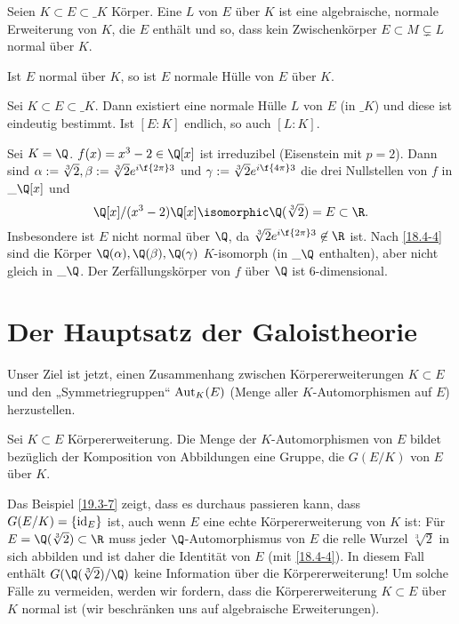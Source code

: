 \begin{df} \label{19.3-5}
	Seien $K \subset E \subset \_K$ Körper.
	Eine  $L$ von $E$ über $K$ ist eine algebraische, normale Erweiterung von $K$, die $E$ enthält und so, dass kein Zwischenkörper $E \subset M \subsetneq L$ normal über $K$.
\end{df}

\begin{note}
	Ist $E$ normal über $K$, so ist $E$ normale Hülle von $E$ über $K$.
\end{note}

\begin{st} \label{19.3-6}
	Sei $K \subset E \subset \_K$.
	Dann existiert eine normale Hülle $L$ von $E$ (in $\_K$) und diese ist eindeutig bestimmt.
	Ist $[E : K]$ endlich, so auch $[L : K]$.
\end{st}

\begin{ex} \label{19.3-7}
	Sei $K = \Q$.
	$f(x) = x^3 - 2 \in \Q[x]$ ist irreduzibel (Eisenstein mit $p = 2$).
	Dann sind $\alpha := \sqrt[3]{2}, \beta := \sqrt[3]{2} e^{i\f{2\pi}3}$ und $\gamma := \sqrt[3]{2} e^{i\f{4\pi}3}$ die drei Nullstellen von $f$ in $\_{\Q}[x]$ und
	\[
		\Q[x] / (x^3-2)\Q[x] \isomorphic \Q(\sqrt[3]{2}) = E \subset \R.
	\]
	Insbesondere ist $E$ nicht normal über $\Q$, da $\sqrt[3]{2} e^{i\f{2\pi}3} \not\in \R$ ist.
	Nach \ref{18.4-4} sind die Körper $\Q(\alpha), \Q(\beta), \Q(\gamma)$ $K$-isomorph (in $\_\Q$ enthalten), aber nicht gleich in $\_{\Q}$.
	Der Zerfällungskörper von $f$ über $\Q$ ist 6-dimensional.
\end{ex}


\section{Der Hauptsatz der Galoistheorie}


Unser Ziel ist jetzt, einen Zusammenhang zwischen Körpererweiterungen $K \subset E$ und den „Symmetriegruppen“ $\operatorname{Aut}_K(E)$ (Menge aller $K$-Automorphismen auf $E$) herzustellen.

\begin{df} \label{19.4-1}
	Sei $K \subset E$ Körpererweiterung.
	Die Menge der $K$-Automorphismen von $E$ bildet bezüglich der Komposition von Abbildungen eine Gruppe, die  $G(E/K)$ von $E$ über $K$.
\end{df}

Das Beispiel \ref{19.3-7} zeigt, dass es durchaus passieren kann, dass $G(E/K) = \{ \operatorname{id}_E \}$ ist, auch wenn $E$ eine echte Körpererweiterung von $K$ ist:
Für $E = \Q(\sqrt[3]{2}) \subset \R$ muss jeder $\Q$-Automorphismus von $E$ die relle Wurzel $\sqrt[3]{2}$ in sich abbilden und ist daher die Identität von $E$ (mit \ref{18.4-4}).
In diesem Fall enthält $G(\Q(\sqrt[3]{2})/\Q)$ keine Information über die Körpererweiterung!
Um solche Fälle zu vermeiden, werden wir fordern, dass die Körpererweiterung $K \subset E$ über $K$ normal ist (wir beschränken uns auf algebraische Erweiterungen).

